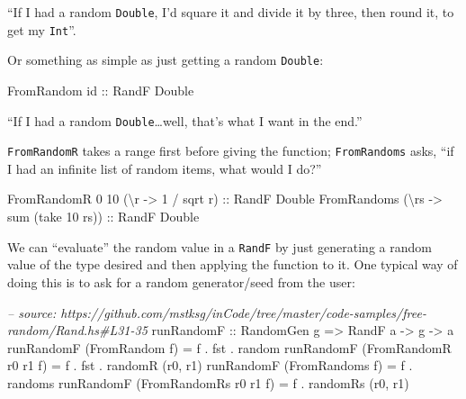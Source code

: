 \documentclass[]{article}
\newenvironment{Shaded}{\begin{snugshade}}{\end{snugshade}}
\newcommand{\CommentTok}[1]{\textcolor[rgb]{0.56,0.35,0.01}{\textit{#1}}}
\newcommand{\DataTypeTok}[1]{\textcolor[rgb]{0.13,0.29,0.53}{#1}}
\newcommand{\DecValTok}[1]{\textcolor[rgb]{0.00,0.00,0.81}{#1}}
\newcommand{\FunctionTok}[1]{\textcolor[rgb]{0.00,0.00,0.00}{#1}}
\newcommand{\NormalTok}[1]{#1}
\newcommand{\OtherTok}[1]{\textcolor[rgb]{0.56,0.35,0.01}{#1}}
\begin{document}
``If I had a random \texttt{Double}, I'd square it and divide it by three, then
round it, to get my \texttt{Int}''.

Or something as simple as just getting a random \texttt{Double}:

\begin{Shaded}
\begin{Highlighting}[]
\DataTypeTok{FromRandom}\OtherTok{ id ::} \DataTypeTok{RandF} \DataTypeTok{Double}
\end{Highlighting}
\end{Shaded}

``If I had a random \texttt{Double}\ldots{}well, that's what I want in the
end.''

\texttt{FromRandomR} takes a range first before giving the function;
\texttt{FromRandoms} asks, ``if I had an infinite list of random items, what
would I do?''

\begin{Shaded}
\begin{Highlighting}[]
\DataTypeTok{FromRandomR} \DecValTok{0} \DecValTok{10}\NormalTok{ (\textbackslash{}r }\OtherTok{->} \DecValTok{1} \FunctionTok{/}\NormalTok{ sqrt r)}\OtherTok{ ::} \DataTypeTok{RandF} \DataTypeTok{Double}
\DataTypeTok{FromRandoms}\NormalTok{ (\textbackslash{}rs }\OtherTok{->}\NormalTok{ sum (take }\DecValTok{10}\NormalTok{ rs))}\OtherTok{ ::} \DataTypeTok{RandF} \DataTypeTok{Double}
\end{Highlighting}
\end{Shaded}

We can ``evaluate'' the random value in a \texttt{RandF} by just generating a
random value of the type desired and then applying the function to it. One
typical way of doing this is to ask for a random generator/seed from the user:

\begin{Shaded}
\begin{Highlighting}[]
\CommentTok{-- source: https://github.com/mstksg/inCode/tree/master/code-samples/free-random/Rand.hs#L31-35}
\OtherTok{runRandomF ::} \DataTypeTok{RandomGen}\NormalTok{ g }\OtherTok{=>} \DataTypeTok{RandF}\NormalTok{ a }\OtherTok{->}\NormalTok{ g }\OtherTok{->}\NormalTok{ a}
\NormalTok{runRandomF (}\DataTypeTok{FromRandom}\NormalTok{ f)         }\FunctionTok{=}\NormalTok{ f }\FunctionTok{.}\NormalTok{ fst }\FunctionTok{.}\NormalTok{ random}
\NormalTok{runRandomF (}\DataTypeTok{FromRandomR}\NormalTok{ r0 r1 f)  }\FunctionTok{=}\NormalTok{ f }\FunctionTok{.}\NormalTok{ fst }\FunctionTok{.}\NormalTok{ randomR (r0, r1)}
\NormalTok{runRandomF (}\DataTypeTok{FromRandoms}\NormalTok{ f)        }\FunctionTok{=}\NormalTok{ f }\FunctionTok{.}\NormalTok{ randoms}
\NormalTok{runRandomF (}\DataTypeTok{FromRandomRs}\NormalTok{ r0 r1 f) }\FunctionTok{=}\NormalTok{ f }\FunctionTok{.}\NormalTok{ randomRs (r0, r1)}
\end{Highlighting}
\end{Shaded}
\end{document}
